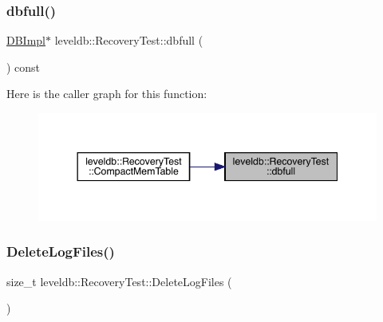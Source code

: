 \subsubsection{\texorpdfstring{dbfull()}{dbfull()}}
{\footnotesize\ttfamily \mbox{\hyperlink{classleveldb_1_1_d_b_impl}{D\+B\+Impl}}$\ast$ leveldb\+::\+Recovery\+Test\+::dbfull (\begin{DoxyParamCaption}{ }\end{DoxyParamCaption}) const\hspace{0.3cm}{\ttfamily [inline]}}

Here is the caller graph for this function\+:
\nopagebreak
\begin{figure}[H]
\begin{center}
\leavevmode
\includegraphics[width=344pt]{classleveldb_1_1_recovery_test_a5b0e79e644c07cd5e1a130268e93c35e_icgraph}
\end{center}
\end{figure}
\mbox{\label{classleveldb_1_1_recovery_test_a4c1f0cadf52c5580bf6a68731bb573c0}} 
\subsubsection{\texorpdfstring{DeleteLogFiles()}{DeleteLogFiles()}}
{\footnotesize\ttfamily size\+\_\+t leveldb\+::\+Recovery\+Test\+::\+Delete\+Log\+Files (\begin{DoxyParamCaption}{ }\end{DoxyParamCaption})\hspace{0.3cm}{\ttfamily [inline]}}


